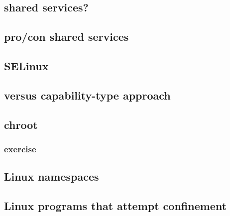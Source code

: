 \subsection{shared services?}


\subsection{pro/con shared services}


\subsection{SELinux}


\subsection{versus capability-type approach}


\subsection{chroot}


\subsubsection{exercise}


\subsection{Linux namespaces}




\subsection{Linux programs that attempt confinement}


